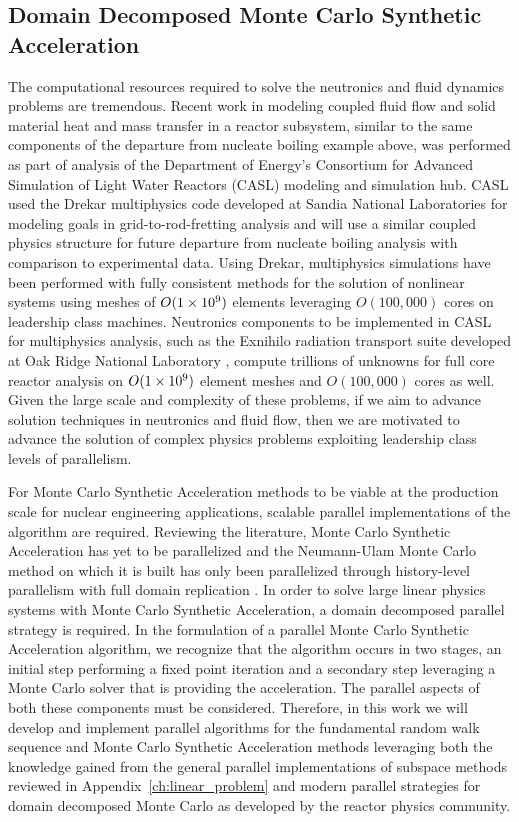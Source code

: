 \subsection{Domain Decomposed Monte Carlo Synthetic Acceleration}
\label{subsec:parallel_motivation}

The computational resources required to solve the neutronics and fluid
dynamics problems are tremendous. Recent work in modeling coupled
fluid flow and solid material heat and mass transfer in a reactor
subsystem, similar to the same components of the departure from
nucleate boiling example above, was performed as part of analysis of
the Department of Energy's Consortium for Advanced Simulation of Light
Water Reactors (CASL) modeling and simulation hub. CASL used the
Drekar multiphysics code developed at Sandia National Laboratories
\cite{pawlowski_drekar_2012} for modeling goals in
grid-to-rod-fretting analysis and will use a similar coupled physics
structure for future departure from nucleate boiling analysis with
comparison to experimental data. Using Drekar, multiphysics
simulations have been performed with fully consistent methods for the
solution of nonlinear systems using meshes of $O(1\times 10^{9})$ elements
leveraging $O(100,000)$ cores on leadership class machines. Neutronics
components to be implemented in CASL for multiphysics analysis, such
as the Exnihilo radiation transport suite developed at Oak Ridge
National Laboratory \cite{evans_denovo:_2010}, compute trillions of
unknowns for full core reactor analysis on $O(1\times 10^{9})$ element
meshes and $O(100,000)$ cores as well. Given the large scale and
complexity of these problems, if we aim to advance solution techniques
in neutronics and fluid flow, then we are motivated to advance the
solution of complex physics problems exploiting leadership class
levels of parallelism.

For Monte Carlo Synthetic Acceleration methods to be viable at the
production scale for nuclear engineering applications, scalable
parallel implementations of the algorithm are required. Reviewing the
literature, Monte Carlo Synthetic Acceleration has yet to be
parallelized and the Neumann-Ulam Monte Carlo method on which it is
built has only been parallelized through history-level parallelism
with full domain replication \cite{alexandrov_efficient_1998}. In
order to solve large linear physics systems with Monte Carlo Synthetic
Acceleration, a domain decomposed parallel strategy is required. In
the formulation of a parallel Monte Carlo Synthetic Acceleration
algorithm, we recognize that the algorithm occurs in two stages, an
initial step performing a fixed point iteration and a secondary step
leveraging a Monte Carlo solver that is providing the
acceleration. The parallel aspects of both these components must be
considered. Therefore, in this work we will develop and implement
parallel algorithms for the fundamental random walk sequence and Monte
Carlo Synthetic Acceleration methods leveraging both the knowledge
gained from the general parallel implementations of subspace methods
reviewed in Appendix~\ref{ch:linear_problem} and modern parallel
strategies for domain decomposed Monte Carlo as developed by the
reactor physics community.

